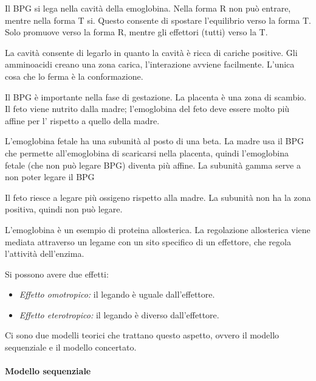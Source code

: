 
Il BPG si lega nella cavità della emoglobina. Nella forma R non può
entrare, mentre nella forma T si. Questo consente di spostare
l'equilibrio verso la forma T.
Solo  promuove verso la forma R, mentre gli effettori (tutti)
verso la T.


La cavità consente di legarlo in quanto la cavità
è ricca di cariche positive. Gli amminoacidi creano una zona carica,
l'interazione avviene facilmente.
L'unica cosa che lo ferma è la conformazione.

Il BPG è importante nella fase di gestazione. La placenta è una zona di
scambio. Il feto viene nutrito dalla madre; l'emoglobina del feto deve
essere molto più affine per l' rispetto a quello della madre.


L'emoglobina fetale ha una subunità \gamma{} al posto di una beta. La
madre usa il BPG che permette all'emoglobina di scaricarsi nella
placenta, quindi l'emoglobina fetale (che non può legare BPG) diventa
più affine.
La subunità gamma serve a non poter legare il BPG


Il feto riesce a legare più ossigeno rispetto alla madre. La subunità
\gamma{} non ha la zona positiva, quindi non può legare.


L'emoglobina è un esempio di proteina allosterica. La regolazione allosterica viene mediata attraverso un legame con un sito specifico di un effettore, che regola l'attività dell'enzima.

Si possono avere due effetti:
\begin{itemize}
   \item \emph{Effetto omotropico:} il legando è uguale dall'effettore.
   \item \emph{Effetto eterotropico:} il legando è diverso dall'effettore.
\end{itemize}

Ci sono due modelli teorici che trattano questo aspetto, ovvero il modello sequenziale e il modello concertato.

\paragraph{Modello sequenziale}

